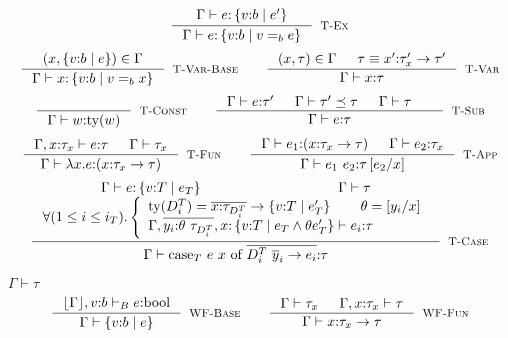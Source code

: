 \documentclass[10pt,a4paper]{article}
\newcommand\rulename[1]{\textsc{#1}\xspace}
\newcommand\rwbase{\rulename{WF-Base}}
\newcommand\rwfun{\rulename{WF-Fun}}
\newcommand\rwcon{\rulename{WF-Con}}
\newcommand\rtvar{\rulename{T-Var}}
\newcommand\rtvarbase{\rulename{T-Var-Base}}
\newcommand\rtconst{\rulename{T-Const}}
\newcommand\rtsub{\rulename{T-Sub}}
\newcommand\rtexact{\rulename{T-Ex}}
\newcommand\rtcase{\rulename{T-Case}}
\newcommand\rtfun{\rulename{T-Fun}}
\newcommand\rtapp{\rulename{T-App}}
\newcommand\dcti{\dct{i}}
\newcommand\dct[1]{\ensuremath{D^T_{#1}}}
\newcommand\efun[2]{\ensuremath{\lambda #1 . #2}}
\newcommand\eapp[2]{\ensuremath{#1 \ #2}}
\newcommand\edata[2]{\ensuremath{#1 \ #2}}
\newcommand\ecase[5]{\ensuremath{\text{case}_T\ #1\ #2\ \text{of}\ \overline{\edata{#3}{#4} \rightarrow #5}}}
\newcommand\tbool{\ensuremath{\text{bool}}}
\newcommand\tref[3]{\ensuremath{\left\lbrace {#1} \colon {#2} \mid {#3} \right\rbrace}}
\newcommand\tconref[4]{\tref{#3}{\tcon{#1}{#2}}{#4}}
\newcommand\tcon[2]{\ensuremath{#1\ #2}}
\newcommand\tfun[3]{\ensuremath{#1\colon #2 \rightarrow #3}}
\newcommand\eqb[1]{\ensuremath{=_{#1}}}
\newcommand\tforalli[1]{\ensuremath{\forall (1\leq i\leq i_{#1})}}
\newcommand\ty[1]{\ensuremath{\text{ty}({#1})}}
\newcommand\sub[2]{\ensuremath{\left[ #2 / #1 \right]}}
\newcommand\erase[1]{\ensuremath{\lfloor #1 \rfloor}}
\newcommand\hastype[3]{\ensuremath{#1 \vdash #2 \colon #3}}
\newcommand\hastypebase[3]{\ensuremath{#1 \vdash_B #2 \colon #3}}
\newcommand\iswellformed[2]{\ensuremath{#1 \vdash #2}}
\newcommand\issubtype[3]{\ensuremath{#1 \vdash #2 \preceq #3}}
\begin{document}
$$
\inference{
	\hastype{\Gamma}{e}{\tref{v}{b}{e'}}
}{
	\hastype{\Gamma}{e}{\tref{v}{b}{v \eqb{b} e}}
}[\rtexact]
$$
$$
\inference{
	(x,\tref{v}{b}{e}) \in \Gamma
}{
	\hastype{\Gamma}{x}{\tref{v}{b}{v \eqb{b} x}}
}[\rtvarbase]
\qquad
\inference{
	(x,\tau) \in \Gamma &&
	\tau \equiv \tfun{x'}{\tau_x'}{\tau'}
}{
	\hastype{\Gamma}{x}{\tau}
}[\rtvar]
$$
$$
\inference{
}{
	\hastype{\Gamma}{w}{\ty{w}}
}[\rtconst]
\qquad
\inference{
	\hastype{\Gamma}{e}{\tau'} &&
	\issubtype{\Gamma}{\tau'}{\tau} &&
	\iswellformed{\Gamma}{\tau} &&
}{
	\hastype{\Gamma}{e}{\tau}
}[\rtsub]
$$
$$
\inference{
	\hastype{\Gamma, x\colon\tau_x}{e}{\tau} &&
	\iswellformed{\Gamma}{\tau_x}
}{
	\hastype{\Gamma}{\efun{x}{e}}{(\tfun{x}{\tau_x}{\tau})}
}[\rtfun]
\qquad
\inference{
	\hastype{\Gamma}{e_1}{(\tfun{x}{\tau_{x}}{\tau})} &&
	\hastype{\Gamma}{e_2}{\tau_{x}}
}{
	\hastype{\Gamma}{\eapp{e_1}{e_2}}{\tau\sub{x}{e_2}}
}[\rtapp]
$$
$$
\inference{
	\hastype{\Gamma}{e}{\tref{v}{T}{e_T}} && \iswellformed{\Gamma}{\tau}\\
	\tforalli{T}. \left\lbrace
	\begin{array}{ll}
 	\ty{\dcti} = \overline{x\colon\tau_{\dcti}}\rightarrow \tref{v}{T}{e'_T} \qquad
 	\theta = \sub{x}{y_i} \cr
	\hastype{\Gamma, \overline{y_i\colon\theta\ \tau_{\dcti}}, 
				x\colon \tref{v}{T}{e_T \land \theta e'_T}
				}{e_i}{\tau}
	\end{array} \right.
}{
	\hastype{\Gamma}{\ecase{e}{x}{\dcti}{\overline{y}_i}{e_i}}{\tau}
}[\rtcase]
$$


\hfill\mbox{\iswellformed{\Gamma}{\tau}}
$$
\inference{
	\hastypebase{\erase{\Gamma}, v\colon b}{e}{\tbool}
}{
	\iswellformed{\Gamma}{\tref{v}{b}{e}}
}[\rwbase]
\qquad
\inference{
	\iswellformed{\Gamma}{\tau_x} &&
	\iswellformed{\Gamma, x \colon \tau_x}{\tau}
}{
	\iswellformed{\Gamma}{\tfun{x}{\tau_x}{\tau}}
}[\rwfun]
$$
\end{document}
